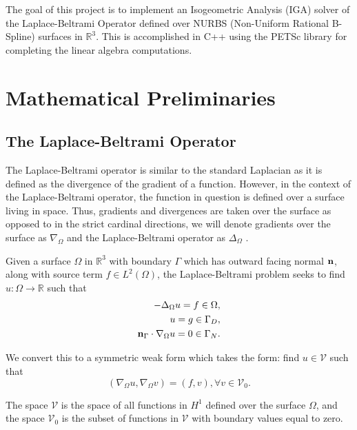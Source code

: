 \documentclass[preprint,1p,12pt]{elsarticle}
\begin{document}
The goal of this project is to implement an Isogeometric Analysis (IGA) solver of the Laplace-Beltrami Operator defined over NURBS (Non-Uniform Rational B-Spline) surfaces in $\mathbb{R}^3$. This is accomplished in C++ using the PETSc library for completing the linear algebra computations. 

\section{Mathematical Preliminaries}
\subsection{The Laplace-Beltrami Operator}
The Laplace-Beltrami operator is similar to the standard Laplacian as it is defined as the divergence of the gradient of a function. However, in the context of the Laplace-Beltrami operator, the function in question is defined over a surface living in space. Thus, gradients and divergences are taken over the surface as opposed to in the strict cardinal directions, we will denote gradients over the surface as $\nabla_{\Omega}$ and the Laplace-Beltrami operator as $\Delta_{\Omega}$ \cite{mimitrios_kamilis_numerical_2013}. 

Given a surface $\Omega$ in $\mathbb{R}^3$ with boundary $\Gamma$ which has outward facing normal $\bold{n}$, along with source term $f \in L^2(\Omega)$, the Laplace-Beltrami problem seeks to find $u : \Omega \rightarrow \mathbb{R}$ such that
\begin{align}
-\Delta_{\Omega}u = f \in \Omega, \\
u = g \in \Gamma_D, \\ 
\bold{n}_{\Gamma} \cdot \nabla_{\Omega} u = 0 \in \Gamma_N. 
\end{align}

We convert this to a symmetric weak form which takes the form: find $u \in \mathcal{V}$ such that
\begin{equation}
\left(\nabla_{\Omega} u, \nabla_{\Omega}v \right) = \left(f, v\right), \forall v \in \mathcal{V}_0.
\end{equation}

The space $\mathcal{V}$ is the space of all functions in $H^1$ defined over the surface $\Omega$, and the space $\mathcal{V}_0$ is the subset of functions in $\mathcal{V}$ with boundary values equal to zero.
\end{document}
